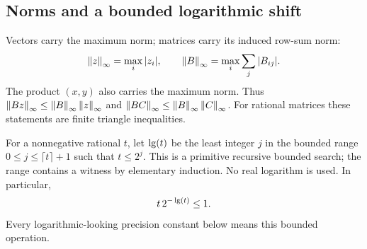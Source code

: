 \subsection{Norms and a bounded logarithmic shift}

Vectors carry the maximum norm; matrices carry its induced row-sum
norm:
\[
 \left\lVert z\right\rVert_\infty=\max_i|z_i|,\qquad
 \left\lVert B\right\rVert_\infty=\max_i\sum_j|B_{ij}|.
\]
The product \((x,y)\) also carries the maximum norm. Thus
\(\left\lVert Bz\right\rVert_\infty\le\left\lVert B\right\rVert_\infty\left\lVert z\right\rVert_\infty\) and
\(\left\lVert BC\right\rVert_\infty\le\left\lVert B\right\rVert_\infty\left\lVert C\right\rVert_\infty\). For rational matrices these statements
are finite triangle inequalities.

For a nonnegative rational \(t\), let \(\operatorname{lg}(t)\) be the least
integer \(j\) in the bounded range \(0\le j\le\lceil t\rceil+1\)
such that \(t\le2^j\). This is a primitive recursive bounded search;
the range contains a witness by elementary induction. No real
logarithm is used. In particular,
\[
 t\,2^{-\operatorname{lg}(t)}\le1.
\]
Every logarithmic-looking precision constant below means this bounded
operation.
